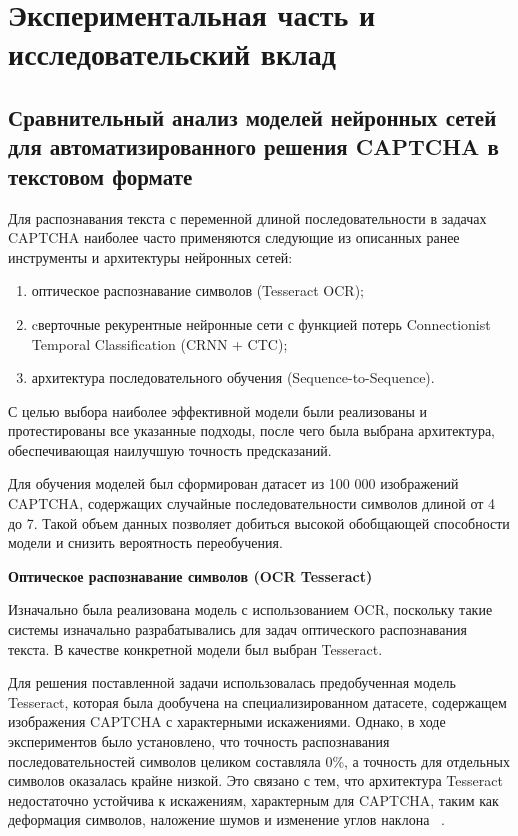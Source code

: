 \chapter{Экспериментальная часть и исследовательский вклад}

\section{Сравнительный анализ моделей нейронных сетей для автоматизированного решения CAPTCHA в текстовом формате}

Для распознавания текста с переменной длиной последовательности в задачах CAPTCHA 
наиболее часто применяются следующие из описанных ранее инструменты и архитектуры 
нейронных сетей:

\begin{enumerate}
    \item оптическое распознавание символов (Tesseract OCR);
    \item cверточные рекурентные нейронные сети с функцией потерь Connectionist 
    Temporal Classification (CRNN + CTC);
    \item архитектура последовательного обучения (Sequence-to-Sequence).
\end{enumerate}

С целью выбора наиболее эффективной модели были реализованы и протестированы все 
указанные подходы, после чего была выбрана архитектура, обеспечивающая наилучшую 
точность предсказаний.

Для обучения моделей был сформирован датасет из 100 000 изображений CAPTCHA, 
содержащих случайные последовательности символов длиной от 4 до 7. Такой объем 
данных позволяет добиться высокой обобщающей способности модели и снизить 
вероятность переобучения.

\textbf{Оптическое распознавание символов (OCR Tesseract)}

Изначально была реализована модель с использованием OCR, поскольку такие системы 
изначально разрабатывались для задач оптического распознавания текста. В качестве 
конкретной модели был выбран Tesseract.

Для решения поставленной задачи использовалась предобученная модель Tesseract, 
которая была дообучена на специализированном датасете, содержащем изображения 
CAPTCHA с характерными искажениями. Однако, в ходе экспериментов было установлено, 
что точность распознавания последовательностей символов целиком составляла 0\%, а 
точность для отдельных символов оказалась крайне низкой. Это связано с тем, что 
архитектура Tesseract недостаточно устойчива к искажениям, характерным для 
CAPTCHA, таким как деформация символов, наложение шумов и изменение углов наклона
~\cite{TrainTesseract}.

